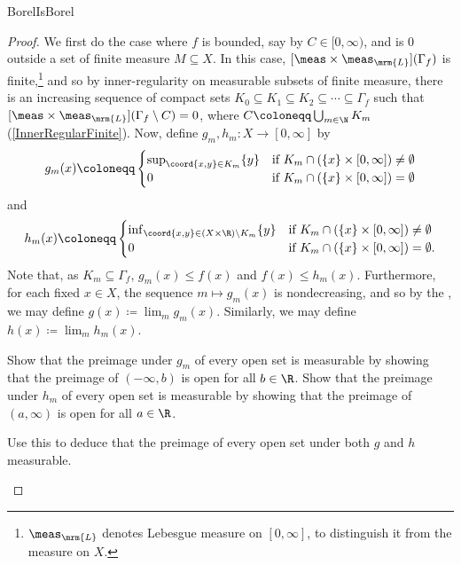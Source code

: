 \begin{prp}{}{BorelIsBorel}
\begin{proof}
We first do the case where $f$ is bounded, say by $C\in [0,\infty )$, and is $0$ outside a set of finite measure $M\subseteq X$.  In this case, $[\meas \times \meas _{\mrm{L}}](\Gamma _f)$ is finite,\footnote{$\meas _{\mrm{L}}$ denotes Lebesgue measure on $[0,\infty ]$, to distinguish it from the measure on $X$.} and so by inner-regularity on measurable subsets of finite measure, there is an increasing sequence of compact sets $K_0\subseteq K_1\subseteq K_2\subseteq \cdots \subseteq \Gamma _f$ such that $[\meas \times \meas _{\mrm{L}}](\Gamma _f\setminus C)=0$, where $C\coloneqq \bigcup _{m\in \N}K_m$ (\cref{InnerRegularFinite}).  Now, define $g_m,h_m:X\rightarrow [0,\infty ]$ by
{\scriptsize
\begin{equation}
g_m(x)\coloneqq \begin{cases}\sup _{\coord{x,y}\in K_m}\{ y\} & \text{if }K_m\cap (\{ x\} \times [0,\infty ])\neq \emptyset \\ 0 & \text{if }K_m\cap (\{ x\} \times [0,\infty ])=\emptyset \end{cases}
\end{equation}
}
and
{\scriptsize
\begin{equation}
h_m(x)\coloneqq \begin{cases}\inf _{\coord{x,y}\in (X\times \R )\setminus K_m}\{ y\} & \text{if }K_m\cap (\{ x\} \times [0,\infty ])\neq \emptyset \\ 0 & \text{if }K_m\cap (\{ x\} \times [0,\infty ])=\emptyset .\end{cases}
\end{equation}
}
Note that, as $K_m\subseteq \Gamma _f$, $g_m(x)\leq f(x)$ and $f(x)\leq h_m(x)$. Furthermore, for each fixed $x\in X$, the sequence $m\mapsto g_m(x)$ is nondecreasing, and so by the , we may define $g(x)\coloneqq \lim _mg_m(x)$.  Similarly, we may define $h(x)\coloneqq \lim _mh_m(x)$.
\begin{exr}[breakable=false]{}{}
Show that the preimage under $g_m$ of every open set is measurable by showing that the preimage of $(-\infty ,b)$ is open for all $b\in \R$.  Show that the preimage under $h_m$ of every open set is measurable by showing that the preimage of $(a,\infty )$ is open for all $a\in \R$.
\end{exr}
\begin{exr}[breakable=false]{}{}
Use this to deduce that the preimage of every open set under both $g$ and $h$ measurable.
\end{exr}
\begin{exr}[breakable=false]{}{}

\end{exr}
\end{proof}
\end{prp}
